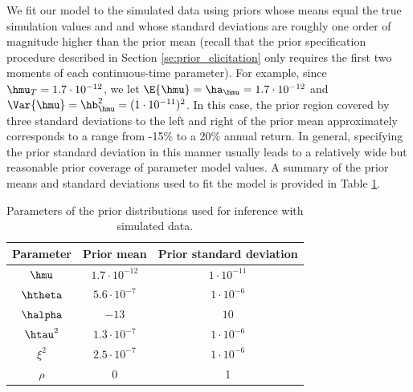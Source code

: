 We fit our model to the simulated data using priors whose means equal
the true simulation values and and whose standard deviations are
roughly one order of magnitude higher than the prior mean (recall that
the prior specification procedure described in Section
\ref{se:prior_elicitation} only requires the first two moments of each
continuous-time parameter). For example, since
$\hmu_T = 1.7 \cdot 10^{-12}$, we let
$\E{\hmu} = \ha_{\hmu} = 1.7 \cdot 10^{-12}$ and
$\Var{\hmu} = \hb_{\hmu}^2 = (1 \cdot 10^{-11})^2$. In this case, the
prior region covered by three standard deviations to the left and
right of the prior mean approximately corresponds to a range from
-15\% to a 20\% annual return.  In general, specifying the prior
standard deviation in this manner usually leads to a relatively wide
but reasonable prior coverage of parameter model values. A summary of
the prior means and standard deviations used to fit the model is
provided in Table \ref{ta:priors}.
\begin{table}[h]
\begin{center}
\begin{tabular}{c|c|c}
  Parameter & Prior mean & Prior standard deviation \\ \hline
  $\hmu$ & $1.7 \cdot 10^{-12}$ & $1 \cdot 10^{-11}$  \\
  $\htheta$ & $5.6 \cdot 10^{-7}$ & $1 \cdot 10^{-6}$  \\
  $\halpha$ & $-13$ & $10$  \\
  $\htau^2$ & $1.3\cdot 10^{-7}$ & $1\cdot 10^{-6}$  \\
  $\xi^2$ & $2.5 \cdot 10^{-7}$ & $1\cdot 10^{-6}$ \\
  $\rho$ & 0 & 1
\end{tabular}
\caption{Parameters of the prior distributions used for inference with simulated data.}\label{ta:priors}
\end{center}
\end{table}



